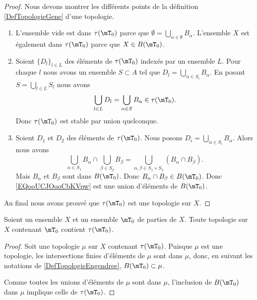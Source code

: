 \begin{proof}
	Nous devons montrer les différents points de la définition \ref{DefTopologieGene} d'une topologie.
	\begin{enumerate}
		\item
		      L'ensemble vide est dans \( \tau(\mT_0)\) parce que \( \emptyset=\bigcup_{\alpha\in \emptyset}B_{\alpha}\). L'ensemble \( X\) est également dans \( \tau(\mT_0)\) parce que \( X\in B(\mT_0)\).

		\item
		      Soient \( \{ D_l \}_{l\in L}\) des éléments de \( \tau(\mT_0)\) indexés par un ensemble \( L\). Pour chaque \( l\) nous avons un ensemble \( S\subset A\) tel que \( D_l=\bigcup_{\alpha\in S_l}B_{\alpha}\). En posant \( S=\bigcup_{l\in L}S_l\) nous avons
		      \begin{equation}
			      \bigcup_{l\in L} D_l=\bigcup_{\alpha\in S}B_{\alpha}\in \tau(\mT_0).
		      \end{equation}
		      Donc \( \tau(\mT_0)\) est stable par union quelconque.
		\item
		      Soient \( D_1\) et \( D_2\) des éléments de \( \tau(\mT_0)\). Nous posons \( D_i=\bigcup_{\alpha\in S_i}B_{\alpha}\). Alors nous avons
		      \begin{equation}        \label{EQooUCJOooCbKVpw}
			      \bigcup_{\alpha\in S_1}B_{\alpha}\cap\bigcup_{\beta\in S_2}B_{\beta}=\bigcup_{\alpha,\beta\in S_1\times S_2}(B_{\alpha}\cap B_{\beta}).
		      \end{equation}
		      Mais \( B_{\alpha}\) et \( B_{\beta}\) sont dans \( B(\mT_0)\). Donc \( B_{\alpha}\cap B_{\beta}\in B(\mT_0)\). Donc \eqref{EQooUCJOooCbKVpw} est une union d'éléments de \( B(\mT_0)\).
	\end{enumerate}
	Au final nous avons prouvé que \( \tau(\mT_0)\) est une topologie sur \( X\).
\end{proof}

\begin{lemma}
	Soient un ensemble \( X\) et un ensemble \( \mT_0\) de parties de \( X\). Toute topologie sur \( X\) contenant \( \mT_0\) contient \( \tau(\mT_0)\).
\end{lemma}

\begin{proof}
	Soit une topologie \( \mu\) sur \( X\) contenant \( \tau(\mT_0)\). Puisque \( \mu\) est une topologie, les intersections finies d'éléments de \( \mu\) sont dans \( \mu\), donc, en suivant les notations de \ref{DefTopologieEngendree}, \( B(\mT_0)\subset \mu\).

	Comme toutes les unions d'éléments de \( \mu\) sont dans \( \mu\), l'inclusion de \( B(\mT_0)\) dans \( \mu\) implique celle de \( \tau(\mT_0)\).
\end{proof}

